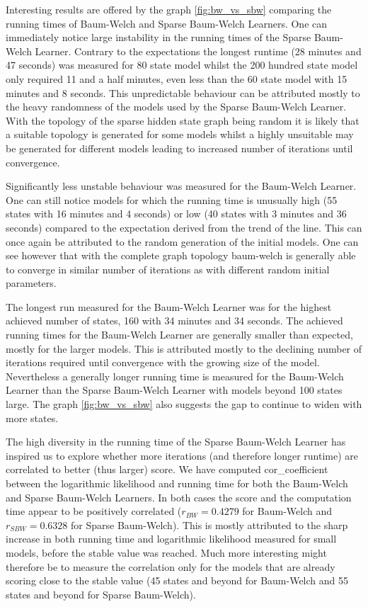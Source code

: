 Interesting results are offered by the graph \ref{fig:bw_vs_sbw} comparing the running times of Baum-Welch and Sparse Baum-Welch Learners. One can immediately notice large instability in the running times of the Sparse Baum-Welch Learner. Contrary to the expectations the longest runtime (28 minutes and 47 seconds) was measured for 80 state model whilst the 200 hundred state model only required 11 and a half minutes, even less than the 60 state model with 15 minutes and 8 seconds. This unpredictable behaviour can be attributed mostly to the heavy randomness of the models used by the Sparse Baum-Welch Learner. With the topology of the sparse hidden state graph being random it is likely that a suitable topology is generated for some models whilst a highly unsuitable may be generated for different models leading to increased number of iterations until convergence.

Significantly less unstable behaviour was measured for the Baum-Welch Learner. One can still notice models for which the running time is unusually high (55 states with 16 minutes and 4 seconds) or low (40 states with 3 minutes and 36 seconds) compared to the expectation derived from the trend of the line. This can once again be attributed to the random generation of the initial models. One can see however that with the complete graph topology \gls{baum-welch} is generally able to converge in similar number of iterations as with different random initial parameters.

The longest run measured for the Baum-Welch Learner was for the highest achieved number of states, 160 with 34 minutes and 34 seconds. The achieved running times for the Baum-Welch Learner are generally smaller than expected, mostly for the larger models. This is attributed mostly to the declining number of iterations required until convergence with the growing size of the model. Nevertheless a generally longer running time is measured for the Baum-Welch Learner than the Sparse Baum-Welch Learner with models beyond 100 states large. The graph \ref{fig:bw_vs_sbw} also suggests the gap to continue to widen with more states.

The high diversity in the running time of the Sparse Baum-Welch Learner has inspired us to explore whether more iterations (and therefore longer runtime) are correlated to better (thus larger) score. We have computed \gls{cor_coefficient} between the logarithmic likelihood and running time for both the Baum-Welch and Sparse Baum-Welch Learners. In both cases the score and the computation time appear to be positively correlated ($r_{BW} = 0.4279$ for Baum-Welch and $r_{SBW} = 0.6328$ for Sparse Baum-Welch). This is mostly attributed to the sharp increase in both running time and logarithmic likelihood measured for small models, before the stable value was reached. Much more interesting might therefore be to measure the correlation only for the models that are already scoring close to the stable value (45 states and beyond for Baum-Welch and 55 states and beyond for Sparse Baum-Welch).

